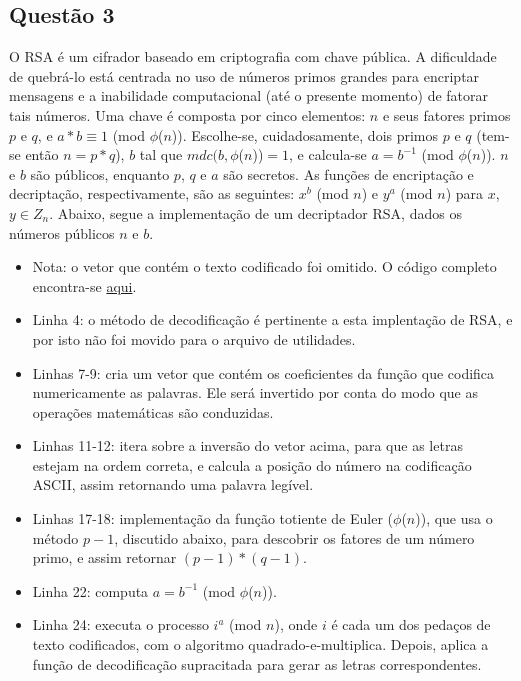 \documentclass{article}
\begin{document}
\subsection*{Questão 3}
O RSA é um cifrador baseado em criptografia com chave pública. A dificuldade de quebrá-lo está centrada no uso de números primos grandes para encriptar mensagens e a inabilidade computacional (até o presente momento) de fatorar tais números. Uma chave é composta por cinco elementos: $n$ e seus fatores primos $p$ e $q$, e $a*b \equiv 1$ (mod $\phi$($n$)). Escolhe-se, cuidadosamente, dois primos $p$ e $q$ (tem-se então $n = p*q$), $b$ tal que $mdc(b, \phi$($n$))$ = 1$, e calcula-se $a = b^{-1}$ (mod $\phi$($n$)). $n$ e $b$ são públicos, enquanto $p$, $q$ e $a$ são secretos. As funções de encriptação e decriptação, respectivamente, são as seguintes: $x^{b}$ (mod $n$) e $y^{a}$ (mod $n$) para $x$, $y \in Z_{n}$. Abaixo, segue a implementação de um decriptador RSA, dados os números públicos $n$ e $b$.
\begin{itemize}

\item Nota: o vetor que contém o texto codificado foi omitido. O código completo encontra-se \href{https://raw.githubusercontent.com/zambonin/UFSC-INE5451/master/T2/rsa.py}{aqui}.
\item Linha 4: o método de decodificação é pertinente a esta implentação de RSA, e por isto não foi movido para o arquivo de utilidades.
\item Linhas 7-9: cria um vetor que contém os coeficientes da função que codifica numericamente as palavras. Ele será invertido por conta do modo que as operações matemáticas são conduzidas.
\item Linhas 11-12: itera sobre a inversão do vetor acima, para que as letras estejam na ordem correta, e calcula a posição do número na codificação ASCII, assim retornando uma palavra legível.
\item Linhas 17-18: implementação da função totiente de Euler ($\phi$($n$)), que usa o método $p - 1$, discutido abaixo, para descobrir os fatores de um número primo, e assim retornar $(p-1)*(q-1)$. 
\item Linha 22: computa $a = b^{-1}$ (mod $\phi$($n$)).
\item Linha 24: executa o processo $i^{a}$ (mod $n$), onde $i$ é cada um dos pedaços de texto codificados, com o algoritmo quadrado-e-multiplica. Depois, aplica a função de decodificação supracitada para gerar as letras correspondentes.
\end{itemize}
\end{document}
